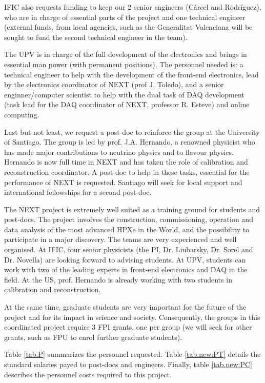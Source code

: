 IFIC also requests funding to keep our 2 senior engineers (C\'arcel and Rodr\'iguez), who are in charge of essential parts of the project and one technical engineer (external funds, from local agencies, such as the Generalitat Valenciana will be sought to fund the second technical engineer in the team). 

The UPV is in charge of the full development of the electronics and brings in essential man power (with permanent positions). The personnel needed is: a technical engineer to help with the development of the front-end electronics, lead by the electronics coordinator of NEXT (prof J. Toledo), and a senior enginner/computer scientist to help with the dual task of DAQ development (task lead for the DAQ coordinator of NEXT, professor R. Esteve) and online computing.  

Last but not least, we request a post-doc to reinforce the group at the University of Santiago. The group is led by prof. J.A. Hernando, a renowned physicist who has made major contributions to neutrino physics and to flavour physics. Hernando is now full time in NEXT and has taken the role of calibration and reconstruction coordinator. A post-doc to help in these tasks, essential for the performance of NEXT is requested. Santiago will seek for local support and international fellowships for a second post-doc.

The NEXT project is extremely well suited as a training ground for students and post-docs. The project involves the construction, commissioning, operation and data analysis of the most advanced HPXe in the World, and the possibility to participate in a major discovery. The teams are very experienced and well organised. At IFIC, four senior physicists (the PI, Dr. Liubarsky, Dr. Sorel and Dr. Novella) are looking forward to advising students. At UPV, students can work with two of the leading experts in front-end electronics and DAQ in the field. At the US, prof. Hernando is already working with two students in calibration and reconstruction.

At the same time, graduate students are very important for the future of the project and for its impact in science and society. Consequently, the groups in this coordinated project require 3 FPI grants, one per group (we will seek for other grants, such as FPU to enrol further graduate students). 

Table \ref{tab.P} summarizes the personnel requested. Table \ref{tab.new:PT} details the standard salaries
payed to post-docs and engineers. Finally, table \ref{tab.new:PC} describes the personnel costs required to this project.

